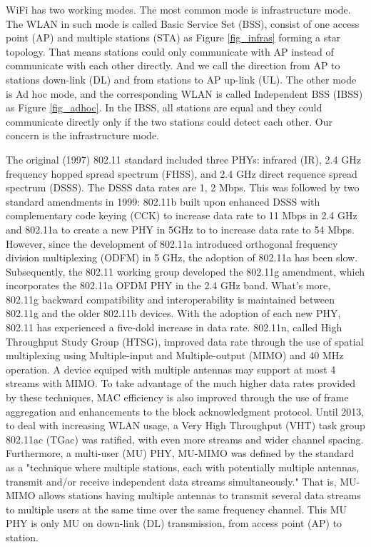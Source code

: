 WiFi has two working modes. 
The most common mode is infrastructure mode. The WLAN in such mode is called Basic Service Set (BSS), consist of one access point (AP) and multiple stations (STA) as Figure \ref{fig_infras} forming a star topology.
That means stations could only communicate with AP instead of communicate with each other directly. 
And we call the direction from AP to stations down-link (DL) and from stations to AP up-link (UL).
The other mode is Ad hoc mode, and the corresponding WLAN is called Independent BSS (IBSS) as Figure \ref{fig_adhoc}.
In the IBSS, all stations are equal and they could communicate directly only if the two stations could detect each other.
Our concern is the infrastructure mode.

The original (1997) 802.11 standard included three PHYs: infrared (IR), 2.4 GHz frequency hopped spread spectrum (FHSS), and 2.4 GHz direct requence spread spectrum (DSSS).
The DSSS data rates are 1, 2 Mbps.
This was followed by two standard amendments in 1999: 802.11b built upon enhanced DSSS with complementary code keying (CCK) to increase data rate to 11 Mbps in 2.4 GHz and 802.11a to create a new PHY in 5GHz to to increase data rate to 54 Mbps.
However, since the development of 802.11a introduced orthogonal frequency division multiplexing (ODFM) in 5 GHz, the adoption of 802.11a has been slow.
Subsequently, the 802.11 working group developed the 802.11g amendment, which incorporates the 802.11a OFDM PHY in the 2.4 GHz band.
What's more, 802.11g backward compatibility and interoperability is maintained between 802.11g and the older 802.11b devices.
With the adoption of each new PHY, 802.11 has experienced a five-dold increase in data rate.
802.11n, called High Throughput Study Group (HTSG), improved data rate through the use of spatial multiplexing using Multiple-input and Multiple-output (MIMO)\cite{foschini1996layered} and 40 MHz operation.
A device equiped with multiple antennas may support at most 4 streams with MIMO. 
To take advantage of the much higher data rates provided by these techniques, MAC efficiency is also improved through the use of frame aggregation and enhancements to the block acknowledgment protocol.
Until 2013, to deal with increasing WLAN usage, a Very High Throughput (VHT) task group 802.11ac (TGac) was ratified, with even more streams and wider channel spacing.
Furthermore, a multi-user (MU) PHY, MU-MIMO\cite{bejarano2013ieee} was defined by the standard as a "technique where multiple stations, each with potentially multiple antennas, transmit and/or receive independent data streams simultaneously."\cite{802.11acspec}
That is, MU-MIMO allows stations having multiple antennas to transmit several data streams to multiple users at the same time over the same frequency channel.
This MU PHY is only MU on down-link (DL) transmission, from access point (AP) to station.

